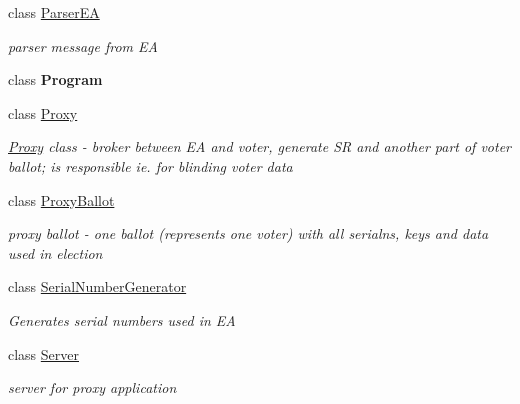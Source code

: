 \begin{DoxyCompactItemize}
class \hyperlink{class_proxy_1_1_parser_e_a}{Parser\+E\+A}
\begin{DoxyCompactList}\small\item\em parser message from E\+A \end{DoxyCompactList}\item 
class {\bfseries Program}
\item 
class \hyperlink{class_proxy_1_1_proxy}{Proxy}
\begin{DoxyCompactList}\small\item\em \hyperlink{class_proxy_1_1_proxy}{Proxy} class -\/ broker between E\+A and voter, generate S\+R and another part of voter ballot; is responsible ie. for blinding voter data \end{DoxyCompactList}\item 
class \hyperlink{class_proxy_1_1_proxy_ballot}{Proxy\+Ballot}
\begin{DoxyCompactList}\small\item\em proxy ballot -\/ one ballot (represents one voter) with all serialns, keys and data used in election \end{DoxyCompactList}\item 
class \hyperlink{class_proxy_1_1_serial_number_generator}{Serial\+Number\+Generator}
\begin{DoxyCompactList}\small\item\em Generates serial numbers used in E\+A \end{DoxyCompactList}\item 
class \hyperlink{class_proxy_1_1_server}{Server}
\begin{DoxyCompactList}\small\item\em server for proxy application \end{DoxyCompactList}\end{DoxyCompactItemize}
